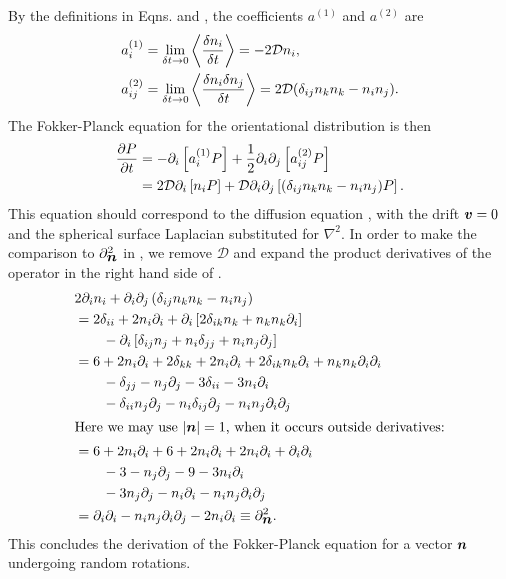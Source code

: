 \documentclass[thesis.tex]{subfiles}
\begin{document}
By the definitions in Eqns.  and , the coefficients $a^{(1)}$ and $a^{(2)}$ are
\begin{align}
	a_i^{(1)} &= \lim_{\delta t\to0}\left\langle\frac{\delta n_i}{\delta t}\right\rangle = -2\mathcal D n_i,\nn\\
	a_{ij}^{(2)} &= \lim_{\delta t\to0}\left\langle\frac{\delta n_i\delta  n_j}{\delta t}\right\rangle = 2\mathcal D(\delta_{ij}n_kn_k - n_i n_j).\eqnlab{a1a2}
\end{align}
The Fokker-Planck equation for the orientational distribution is then
\begin{align}
	\frac{\partial P}{\partial t} &= -\partial_i\left[a^{(1)}_i P\right] + \frac{1}{2}\partial_i\partial_j\left[a^{(2)}_{ij} P\right]\nn\\
&= 2\mathcal D\partial_i \left[n_i P\right] + \mathcal D\partial_i \partial_j\left[(\delta_{ij}n_kn_k-n_in_j) P\right].\eqnlab{fpe1}	
\end{align}
This equation should correspond to the diffusion equation , with the drift $\mbox{\boldmath$v$}=0$ and the spherical surface Laplacian  substituted for $\nabla^2$. In order to make the comparison to $\partial^2_{\mbox{\boldmath$n$}}$ in , we remove $\mathcal D$ and expand the product derivatives of the operator in the right hand side of .
\begin{align*}
	& 2\partial_i n_i + \partial_i \partial_j\left(\delta_{ij}n_kn_k-n_in_j\right)\\
	&= 2\delta_{ii} + 2n_i\partial_i + \partial_i\left[2\delta_{ik}n_k+n_kn_k\partial_i\right]  \\
	&\qquad - \partial_i\left[\delta_{ij}n_j + n_i\delta_{jj}+ n_in_j\partial_j\right]\\
	&=6 + 2n_i\partial_i + 2\delta_{kk} + 2n_i\partial_i + 2\delta_{ik}n_k\partial_i + n_kn_k\partial_i\partial_i \\
	&\qquad -\delta_{jj}-n_j\partial_j-3\delta_{ii}-3n_i\partial_i\\
	&\qquad-\delta_{ii}n_j\partial_j-n_i\delta_{ij}\partial_j-n_in_j\partial_i\partial_j \\
	\intertext{Here we may use $|\mbox{\boldmath$n$}|=1$, when it occurs outside derivatives:}
	&=6 + 2n_i\partial_i + 6 + 2n_i\partial_i + 2n_i\partial_i + \partial_i\partial_i \\
	&\qquad -3-n_j\partial_j-9-3n_i\partial_i\\
	&\qquad-3n_j\partial_j-n_i\partial_i-n_in_j\partial_i\partial_j \\
	&= \partial_i\partial_i -n_in_j\partial_i\partial_j - 2 n_i \partial_i \equiv \partial^2_{\mbox{\boldmath$n$}}.
\end{align*}
This concludes the derivation of the Fokker-Planck equation for a vector $\mbox{\boldmath$n$}$ undergoing random rotations.
\end{document}
